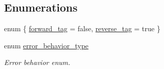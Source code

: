 \subsection*{Enumerations}
\begin{DoxyCompactItemize}
\item 
enum \{ \hyperlink{namespaceIceBRG_a3f2c2517005b9902e3eb97894b072f91ac4e94566c20918ca2fe2c7ccdfdec928}{forward\-\_\-tag} =  false, 
\hyperlink{namespaceIceBRG_a3f2c2517005b9902e3eb97894b072f91a9793d1e2c6b63e17ed62034e78307b63}{reverse\-\_\-tag} =  true
 \}
\item 
enum \hyperlink{namespaceIceBRG_afc0a41c01ba37ad05cd3032371417832}{error\-\_\-behavior\-\_\-type} 
\begin{DoxyCompactList}\small\item\em Error behavior enum. \end{DoxyCompactList}\end{DoxyCompactItemize}
